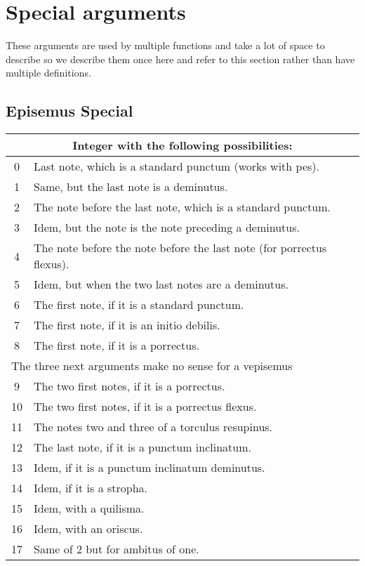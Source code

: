 \section{Special arguments}

These arguments are used by multiple functions and take a lot of space
to describe so we describe them once here and refer to this section
rather than have multiple definitions.

\subsection{Episemus Special}\label{EpisemusSpecial}
\begin{tabular}{cp{}}
  \multicolumn{2}{c}{Integer with the following possibilities:} \\
  \hline
  0 & Last note, which is a standard punctum (works with pes).\\
  1 & Same, but the last note is a deminutus.\\
  2 & The note before the last note, which is a standard punctum.\\
  3 & Idem, but the note is the note preceding a deminutus.\\
  4 & The note before the note before the last note (for porrectus flexus).\\
  5 & Idem, but when the two last notes are a deminutus.\\
  6 & The first note, if it is a standard punctum.\\
  7 & The first note, if it is an initio debilis.\\
  8 & The first note, if it is a porrectus.\\
  \multicolumn{2}{l}{The three next arguments make no sense for a vepisemus}\\
  9 & The two first notes, if it is a porrectus.\\
  10 & The two first notes, if it is a porrectus flexus.\\
  11 & The notes two and three of a torculus resupinus.\\
  12 & The last note, if it is a punctum inclinatum.\\
  13 & Idem, if it is a punctum inclinatum deminutus.\\
  14 & Idem, if it is a stropha.\\
  15 & Idem, with a quilisma.\\
  16 & Idem, with an oriscus.\\
  17 & Same of 2 but for ambitus of one.\\

\end{tabular}

